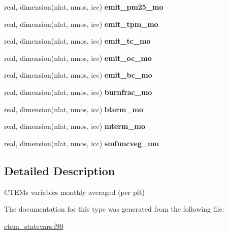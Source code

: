 \begin{DoxyCompactItemize}
\item 
\hypertarget{structctem__statevars_1_1ctem__monthly_a8b2dc93819127fea213287bc4ecb93d1}{}real, dimension(nlat, nmos, icc) {\bfseries emit\+\_\+pm25\+\_\+mo}\label{structctem__statevars_1_1ctem__monthly_a8b2dc93819127fea213287bc4ecb93d1}

\item 
\hypertarget{structctem__statevars_1_1ctem__monthly_a10b7dfdea9297e2c8904961adfe514a1}{}real, dimension(nlat, nmos, icc) {\bfseries emit\+\_\+tpm\+\_\+mo}\label{structctem__statevars_1_1ctem__monthly_a10b7dfdea9297e2c8904961adfe514a1}

\item 
\hypertarget{structctem__statevars_1_1ctem__monthly_a16834b0f0ce4bbe31917c2bca352a4e2}{}real, dimension(nlat, nmos, icc) {\bfseries emit\+\_\+tc\+\_\+mo}\label{structctem__statevars_1_1ctem__monthly_a16834b0f0ce4bbe31917c2bca352a4e2}

\item 
\hypertarget{structctem__statevars_1_1ctem__monthly_a5d03ff9f6b5bd7c73d4a527ea3fbfcd4}{}real, dimension(nlat, nmos, icc) {\bfseries emit\+\_\+oc\+\_\+mo}\label{structctem__statevars_1_1ctem__monthly_a5d03ff9f6b5bd7c73d4a527ea3fbfcd4}

\item 
\hypertarget{structctem__statevars_1_1ctem__monthly_a3b3a44461c1500534e0cf43c8a893d54}{}real, dimension(nlat, nmos, icc) {\bfseries emit\+\_\+bc\+\_\+mo}\label{structctem__statevars_1_1ctem__monthly_a3b3a44461c1500534e0cf43c8a893d54}

\item 
\hypertarget{structctem__statevars_1_1ctem__monthly_ad09a863284db42373e88bbeeb704ac4d}{}real, dimension(nlat, nmos, icc) {\bfseries burnfrac\+\_\+mo}\label{structctem__statevars_1_1ctem__monthly_ad09a863284db42373e88bbeeb704ac4d}

\item 
\hypertarget{structctem__statevars_1_1ctem__monthly_a1da7d0aa01f4162a74ea9fad6c7dfb0d}{}real, dimension(nlat, nmos, icc) {\bfseries bterm\+\_\+mo}\label{structctem__statevars_1_1ctem__monthly_a1da7d0aa01f4162a74ea9fad6c7dfb0d}

\item 
\hypertarget{structctem__statevars_1_1ctem__monthly_adb808fe8e2ff0aec77c1e3bdb5df1ccc}{}real, dimension(nlat, nmos, icc) {\bfseries mterm\+\_\+mo}\label{structctem__statevars_1_1ctem__monthly_adb808fe8e2ff0aec77c1e3bdb5df1ccc}

\item 
\hypertarget{structctem__statevars_1_1ctem__monthly_aa01b5a2d2c5398667019f55109e667dc}{}real, dimension(nlat, nmos, icc) {\bfseries smfuncveg\+\_\+mo}\label{structctem__statevars_1_1ctem__monthly_aa01b5a2d2c5398667019f55109e667dc}

\end{DoxyCompactItemize}


\subsection{Detailed Description}
C\+T\+E\+M\textquotesingle{}s variables monthly averaged (per pft) 

The documentation for this type was generated from the following file\+:\begin{DoxyCompactItemize}
\item 
\hyperlink{ctem__statevars_8f90}{ctem\+\_\+statevars.\+f90}\end{DoxyCompactItemize}
